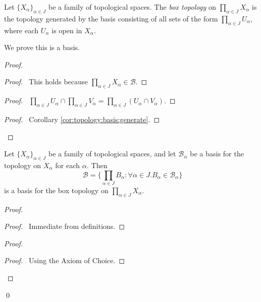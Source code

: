 \begin{df}
  Let $\{ X_\alpha \}_{\alpha \in J}$ be a family of topological spaces. The
  \emph{box topology} on $\prod_{\alpha \in J} X_\alpha$ is the topology
  generated by the basis consisting of all sets of the form $\prod_{\alpha
    \in J} U_\alpha$, where each $U_\alpha$ is open in $X_\alpha$.

  We prove this is a basis.
\end{df}

\begin{proof}
  \pf
  \begin{proof}
    \pf\ This holds because $\prod_{\alpha \in J} X_\alpha \in \mathcal{B}$.
  \end{proof}
  \begin{proof}
    \pf\ $\prod_{\alpha \in J} U_\alpha \cap \prod_{\alpha \in J} V_\alpha =
    \prod_{\alpha \in J} (U_\alpha \cap V_\alpha)$.
  \end{proof}
  \qedstep
  \begin{proof}
    \pf\ Corollary \ref{cor:topology:basis:generate}.
  \end{proof}
\end{proof}

\begin{thm}[AC]
  Let $\{X_\alpha\}_{\alpha \in J}$ be a family of topological spaces, and
  let $\mathcal{B}_\alpha$ be a basis for the topology on $X_\alpha$ for each
  $\alpha$. Then
  \[ \mathcal{B} = \{ \prod_{\alpha \in J} B_\alpha : \forall \alpha \in J.
  B_\alpha \in \mathcal{B}_\alpha \} \]
  is a basis for the box topology on $\prod_{\alpha \in J} X_\alpha$.
\end{thm}

\begin{proof}
  \pf
  \begin{proof}
    \pf\ Immediate from definitions.
  \end{proof}
  \begin{proof}
    \begin{proof}
      \pf\ Using the Axiom of Choice.
    \end{proof}
  \end{proof}
  \qed
\end{proof}

